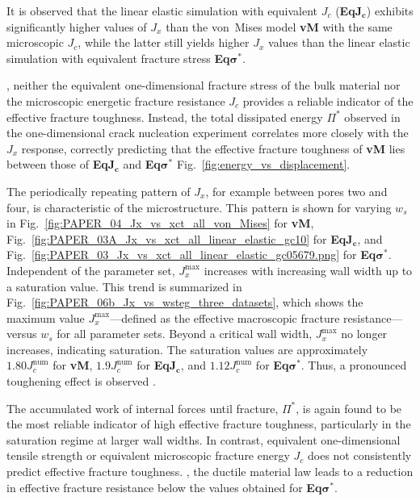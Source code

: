 \documentclass[pdflatex,sn-mathphys-num]{sn-jnl}%
\newcommand{\vMLabel}{\textbf{vM}\xspace}
\newcommand{\EqJcLabel}{\textbf{Eq$\boldsymbol{J_c}$}\xspace}
\newcommand{\EqSigmaStarLabel}{\textbf{Eq$\boldsymbol{\sigma^*}$}\xspace}
\theoremstyle{thmstyleone}%
\theoremstyle{thmstyletwo}%
\theoremstyle{thmstylethree}%
\begin{document}
It is observed that the linear elastic simulation with equivalent $J_c$ (\EqJcLabel) exhibits significantly higher values of $J_x$ than the von~Mises model \vMLabel with the same microscopic $J_c$, while the latter still yields higher $J_x$ values than the linear elastic simulation with equivalent fracture stress \EqSigmaStarLabel.

, neither the equivalent one-dimensional fracture stress of the bulk material nor the microscopic energetic fracture resistance $J_c$ provides a reliable indicator of the effective fracture toughness. Instead, the total dissipated energy $\Pi^*$ observed in 
the one-dimensional crack nucleation experiment correlates more closely with the $J_x$ response, correctly predicting that the effective fracture toughness of \vMLabel lies between those of \EqJcLabel and \EqSigmaStarLabel{} Fig.~\ref{fig:energy_vs_displacement}.

The periodically repeating pattern of $J_x$, for example between pores two and four, is characteristic of the microstructure. This pattern is shown for varying $w_s$ in Fig.~\ref{fig:PAPER_04_Jx_vs_xct_all_von_Mises} for \vMLabel, Fig.~\ref{fig:PAPER_03A_Jx_vs_xct_all_linear_elastic_gc10} for \EqJcLabel, and Fig.~\ref{fig:PAPER_03_Jx_vs_xct_all_linear_elastic_gc05679.png} for \EqSigmaStarLabel. Independent of the parameter set, $J_x^{\text{max}}$ increases with increasing wall width up to a saturation value. This trend is summarized in Fig.~\ref{fig:PAPER_06b_Jx_vs_wsteg_three_datasets}, which shows the maximum value $J_x^{\text{max}}$—defined as the effective macroscopic fracture resistance—versus $w_s$ for all parameter sets. Beyond a critical wall width, $J_x^{\text{max}}$ no longer increases, indicating saturation. The saturation values are approximately $1.80 J_c^{\text{num}}$ for \vMLabel, $1.9 J_c^{\text{num}}$ for \EqJcLabel, and $1.12 J_c^{\text{num}}$ for \EqSigmaStarLabel. Thus, a pronounced toughening effect is observed .

The accumulated work of internal forces until fracture, $\Pi^*$, is again found to be the most reliable indicator of high effective fracture toughness, particularly in the saturation regime at larger wall widths. In contrast, equivalent one-dimensional tensile strength or equivalent microscopic fracture energy $J_c$ does not consistently predict effective fracture toughness. , the ductile material law leads to a reduction in effective fracture resistance below the values obtained for \EqSigmaStarLabel.
\end{document}
